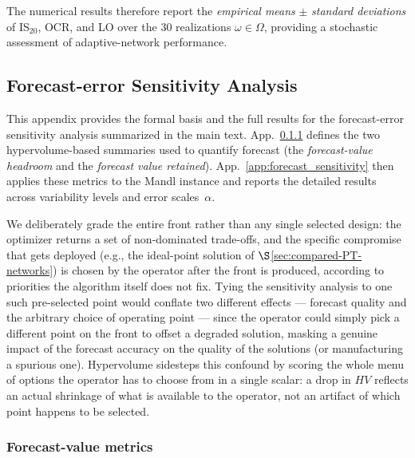\documentclass[a4paper,fleqn]{cas-sc}
\begin{document}
The numerical results therefore report the \emph{empirical means} $\pm$ \emph{standard deviations} of IS$_{20}$, OCR, and LO over the 30 realizations $\omega \in \Omega$, providing a stochastic assessment of adaptive-network performance.

\subsection{Forecast-error Sensitivity Analysis}
\label{app:forecastValue}

This appendix provides the formal basis and the full results for the forecast-error sensitivity analysis summarized in the main text. App.~\ref{app:forecastValueMetrics} defines the two hypervolume-based summaries used to quantify  forecast  (the \emph{forecast-value headroom} and the \emph{forecast value retained}). App.~\ref{app:forecast_sensitivity} then applies these metrics to the Mandl instance and reports the detailed results across variability levels and error scales~$\alpha$.

We deliberately grade the entire front rather than any single selected design: the optimizer returns a set of non-dominated trade-offs, and the specific compromise that gets deployed (e.g., the ideal-point solution of $\S$\ref{sec:compared-PT-networks}) is chosen by the operator after the front is produced, according to priorities the algorithm itself does not fix. Tying the sensitivity analysis to one such pre-selected point would conflate two different effects — forecast quality and the arbitrary choice of operating point — since the operator could simply pick a different point on the front to offset a degraded solution, masking a genuine impact of the forecast accuracy on the quality of the solutions (or manufacturing a spurious one). Hypervolume sidesteps this confound by scoring the whole menu of options the operator has to choose from in a single scalar: a drop in $HV$ reflects an actual shrinkage of what is available to the operator, not an artifact of which point happens to be selected.

\subsubsection{Forecast-value metrics}
\label{app:forecastValueMetrics}
\end{document}

